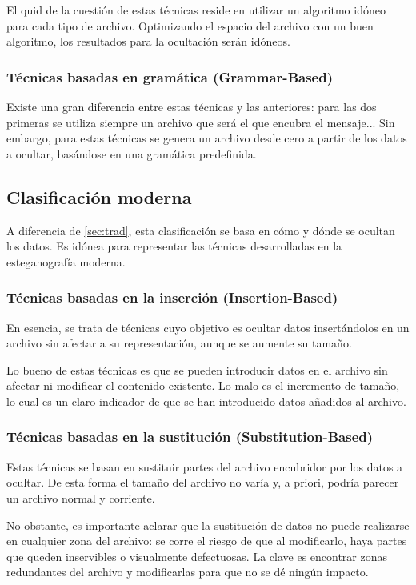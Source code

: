 El quid de la cuestión de estas técnicas reside en utilizar un algoritmo idóneo para cada tipo de archivo. Optimizando el espacio del archivo con un buen algoritmo, los resultados para la ocultación serán idóneos.

\subsubsection{Técnicas basadas en gramática (Grammar-Based)}

Existe una gran diferencia entre estas técnicas y las anteriores: para las dos primeras se utiliza siempre un archivo que será el que encubra el mensaje... Sin embargo, para estas técnicas se genera un archivo desde cero a partir de los datos a ocultar, basándose en una gramática predefinida. %

\subsection{Clasificación moderna}

A diferencia de \ref{sec:trad}, esta clasificación se basa en cómo y dónde se ocultan los datos. Es idónea para representar las técnicas desarrolladas en la esteganografía moderna.

\subsubsection{Técnicas basadas en la inserción (Insertion-Based)}

En esencia, se trata de técnicas cuyo objetivo es ocultar datos insertándolos en un archivo sin afectar a su representación, aunque se aumente su tamaño.

Lo bueno de estas técnicas es que se pueden introducir datos en el archivo sin afectar ni modificar el contenido existente. Lo malo es el incremento de tamaño, lo cual es un claro indicador de que se han introducido datos añadidos al archivo.

\subsubsection{Técnicas basadas en la sustitución (Substitution-Based)}

Estas técnicas se basan en sustituir partes del archivo encubridor por los datos a ocultar. De esta forma el tamaño del archivo no varía y, a priori, podría parecer un archivo normal y corriente.

No obstante, es importante aclarar que la sustitución de datos no puede realizarse en cualquier zona del archivo: se corre el riesgo de que al modificarlo, haya partes que queden inservibles o visualmente defectuosas. La clave es encontrar zonas redundantes del archivo y modificarlas para que no se dé ningún impacto.

